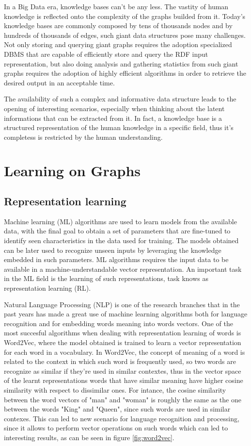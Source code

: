 \documentclass[%
    corpo=13.5pt,
    twoside,
    oldstyle,
    tipotesi=magistrale,
    greek,
    evenboxes
]{toptesi}
\begin{document}
In a Big Data era, knowledge bases can't be any less. The vastity of human
knowledge is reflected onto the complexity of the graphs
builded from it. Today's knowledge bases are commonly composed by tens of
thousands nodes and by hundreds of thousands of edges, such giant data
structures pose many challenges.
Not only storing and querying giant graphs requires the adoption
specialized DBMS that are capable of efficiently store and query the RDF
input representation, but also doing analysis and gathering statistics from
such giant graphs requires the adoption of highly efficient algorithms in
order to retrieve the desired output in an acceptable time.

The availability of such a complex and informative data structure leads
to the opening of interesting scenarios, especially when thinking about
the latent informations that can be extracted from it. In
fact, a knowledge base is a structured representation of the
human knowledge in a specific field, thus it's completess is restricted
by the human understanding.


\section{Learning on Graphs}

\subsection{Representation learning}

Machine learning (ML) algorithms are used to learn models from the
available data, with the final goal to obtain a set of parameters
that are fine-tuned to identify seen characteristics in the data
used for training. The models obtained can be later used to
recognize unseen inputs by leveraging the knowledge embedded
in such parameters.
ML algorithms requires the input data to be available in a
machine-understandable vector representation. An important task
in the ML field is the learning of such representations, task knows
as representation learning (RL).

Natural Language Processing (NLP) is one of the research branches that in
the past years has made a great use of machine learning algorithms both for
language recognition and for embedding words meaning into words vectors.
One of the most succesful algorithms when dealing with representation learning
of words is Word2Vec, where the model obtained is trained to learn a vector
representation for each word in a vocabulary.
In Word2Vec, the concept of meaning of a word is related to the context in
which such word is frequently used, so two words are recognize as similar if
they're used in similar contextes, thus in the vector space of the learnt
representations words that have similar meaning have higher cosine similarity
with respect to dissimilar ones.
For intance, the cosine similarity between the word vectors of "man" and "woman"
is roughly the same as the one between the words "King" and "Queen", since such
words are used in similar contexes. This can led to new scenario for
language recognition and processing, since it allows to perform vector
operations on such words which can led to interesting results, as can be seen
in figure \ref{fig:word2vec}.
\end{document}
